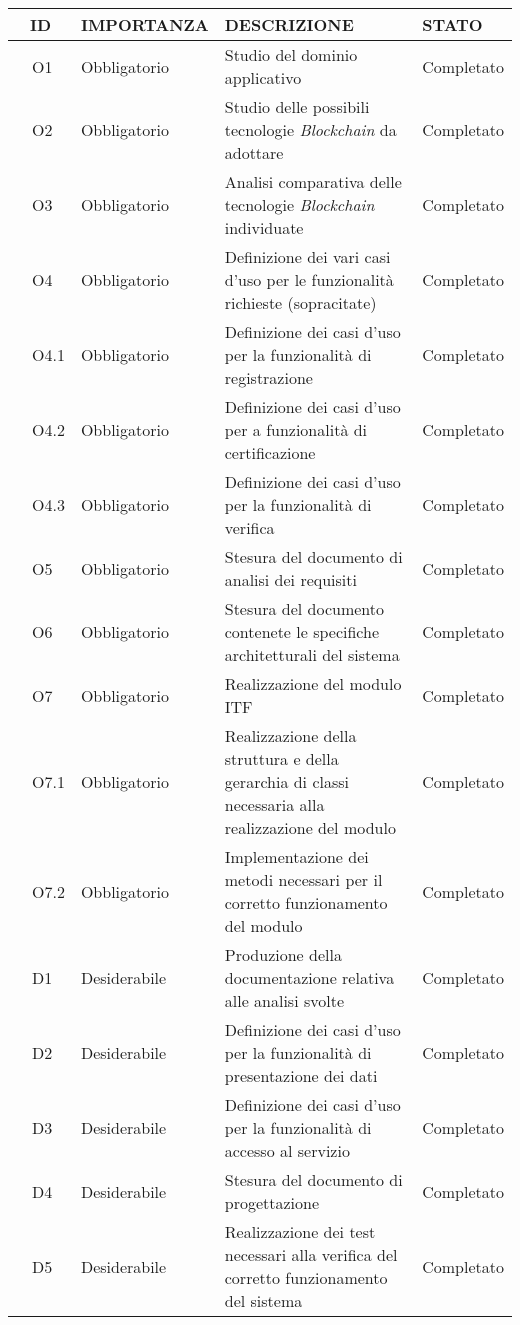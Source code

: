 \begin{longtable}{|r l|p{3cm}|p{8cm}|p{2cm}|}
	\hline
	\multicolumn{2}{|c|}{\textbf{ID}} & \textbf{IMPORTANZA} & \textbf{DESCRIZIONE} & \textbf{STATO}\tabularnewline
	\hline
	& O1 & Obbligatorio & Studio del dominio applicativo & Completato\\\hline
	& O2 & Obbligatorio & Studio delle possibili tecnologie \textit{Blockchain} da adottare & Completato \\\hline
	& O3 & Obbligatorio & Analisi comparativa delle tecnologie \textit{Blockchain} individuate & Completato \\\hline
	& O4 & Obbligatorio & Definizione dei vari casi d'uso per le funzionalità richieste (sopracitate) & Completato \\\hline
	& O4.1 & Obbligatorio & Definizione dei casi d'uso per la funzionalità di registrazione & Completato\\\hline
	& O4.2 & Obbligatorio & Definizione dei casi d'uso per a funzionalità di certificazione & Completato\\\hline
	& O4.3 & Obbligatorio & Definizione dei casi d'uso per la funzionalità di verifica & Completato\\\hline
	& O5 & Obbligatorio & Stesura del documento di analisi dei requisiti & Completato\\\hline
	& O6 & Obbligatorio & Stesura del documento contenete le specifiche architetturali del sistema & Completato\\\hline
	& O7 & Obbligatorio & Realizzazione del modulo \gls{ITF} & Completato\\\hline
	& O7.1 & Obbligatorio & Realizzazione della struttura e della gerarchia di classi necessaria alla realizzazione del modulo & Completato \\\hline
	& O7.2 & Obbligatorio & Implementazione dei metodi necessari per il corretto funzionamento del modulo & Completato\\\hline
	& D1 & Desiderabile & Produzione della documentazione relativa alle analisi svolte & Completato \\\hline
	& D2 & Desiderabile & Definizione dei casi d'uso per la funzionalità di presentazione dei dati & Completato \\\hline
	& D3 & Desiderabile & Definizione dei casi d'uso per la funzionalità di accesso al servizio & Completato\\\hline
	& D4 & Desiderabile & Stesura del documento di progettazione & Completato\\\hline
	& D5 & Desiderabile & Realizzazione dei test necessari alla verifica del corretto funzionamento del sistema & Completato\\\hline

\end{longtable}
